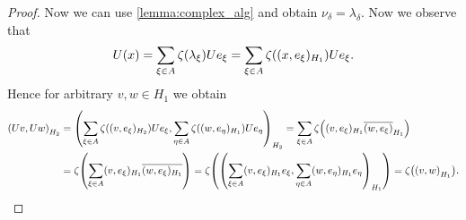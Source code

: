 \begin{proof}
	Now we can use \ref{lemma:complex_alg} and obtain $\nu_\delta = \lambda_\delta$. Now we observe that 
	\begin{align*}
		U(x) = \sum_{\xi \in A} \zeta(\lambda_\xi) Ue_\xi = \sum_{\xi \in A} \zeta{\left ( (x, e_\xi)_{H_1} \right )} Ue_\xi.
	\end{align*}
	Hence for arbitrary $v,w \in H_1$ we obtain
	\begin{align*}
		{\left ( Uv, Uw \right )}_{H_2} &= {\left ( \sum_{\xi \in A} \zeta((v, e_\xi)_{H_2}) Ue_\xi, \sum_{\eta \in A} \zeta((w, e_\eta)_{H_1}) Ue_\eta \right )}_{H_2} = \sum_{\xi \in A} \zeta{\left ( (v, e_\xi)_{H_1} \overline{(w,e_\xi)}_{H_1} \right )} \\
		&= \zeta {\left ( \sum_{\xi \in A} (v, e_\xi)_{H_1} \overline{(w, e_\xi)_{H_1}} \right )} = \zeta{\left ( {\left ( \sum_{\xi \in A} (v, e_\xi)_{H_1} e_\xi, \sum_{\eta \in A} (w, e_\eta)_{H_1} e_\eta \right )}_{H_1} \right )} = \zeta{\left ( {\left ( v, w \right )}_{H_1} \right )}.
	\end{align*}
\end{proof}
